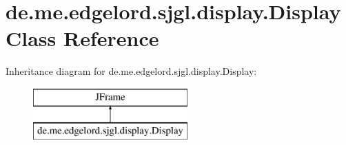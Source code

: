 \hypertarget{classde_1_1me_1_1edgelord_1_1sjgl_1_1display_1_1_display}{}\section{de.\+me.\+edgelord.\+sjgl.\+display.\+Display Class Reference}
\label{classde_1_1me_1_1edgelord_1_1sjgl_1_1display_1_1_display}
Inheritance diagram for de.\+me.\+edgelord.\+sjgl.\+display.\+Display\+:\begin{figure}[H]
\begin{center}
\leavevmode
\includegraphics[height=2.000000cm]{classde_1_1me_1_1edgelord_1_1sjgl_1_1display_1_1_display}
\end{center}
\end{figure}
